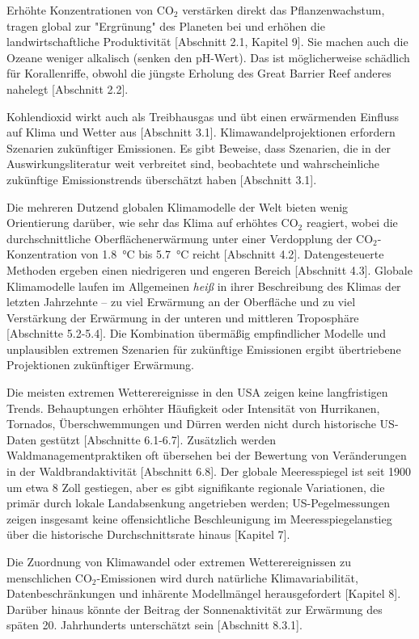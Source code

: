 \documentclass[12pt,paper=a4,DIV=12,parskip=never,chapterprefix=false,headings=standardclasses]{scrreprt}
\begin{document}
Erhöhte Konzentrationen von CO$_2$ verstärken direkt das Pflanzenwachstum, tragen global zur "Ergrünung" des Planeten bei und erhöhen die landwirtschaftliche Produktivität [Abschnitt 2.1, Kapitel 9]. Sie machen auch die Ozeane weniger alkalisch (senken den pH-Wert). Das ist möglicherweise schädlich für Korallenriffe, obwohl die jüngste Erholung des Great Barrier Reef anderes nahelegt [Abschnitt 2.2].

Kohlendioxid wirkt auch als Treibhausgas und übt einen erwärmenden Einfluss auf Klima und Wetter aus [Abschnitt 3.1]. Klimawandelprojektionen erfordern Szenarien zukünftiger Emissionen. Es gibt Beweise, dass Szenarien, die in der Auswirkungsliteratur weit verbreitet sind, beobachtete und wahrscheinliche zukünftige Emissionstrends überschätzt haben [Abschnitt 3.1].

Die mehreren Dutzend globalen Klimamodelle der Welt bieten wenig Orientierung darüber, wie sehr das Klima auf erhöhtes CO$_2$ reagiert, wobei die durchschnittliche Oberflächenerwärmung unter einer Verdopplung der CO$_2$-Konzentration von \SI{1.8}{\celsius} bis \SI{5.7}{\celsius} reicht [Abschnitt 4.2]. Datengesteuerte Methoden ergeben einen niedrigeren und engeren Bereich [Abschnitt 4.3]. Globale Klimamodelle laufen im Allgemeinen \emph{heiß} in ihrer Beschreibung des Klimas der letzten Jahrzehnte -- zu viel Erwärmung an der Oberfläche und zu viel Verstärkung der Erwärmung in der unteren und mittleren Troposphäre [Abschnitte 5.2-5.4]. Die Kombination übermäßig empfindlicher Modelle und unplausiblen extremen Szenarien für zukünftige Emissionen ergibt übertriebene Projektionen zukünftiger Erwärmung.

Die meisten extremen Wetterereignisse in den USA zeigen keine langfristigen Trends. Behauptungen erhöhter Häufigkeit oder Intensität von Hurrikanen, Tornados, Überschwemmungen und Dürren werden nicht durch historische US-Daten gestützt [Abschnitte 6.1-6.7]. Zusätzlich werden Waldmanagementpraktiken oft übersehen bei der Bewertung von Veränderungen in der Waldbrandaktivität [Abschnitt 6.8]. Der globale Meeresspiegel ist seit 1900 um etwa 8 Zoll gestiegen, aber es gibt signifikante regionale Variationen, die primär durch lokale Landabsenkung angetrieben werden; US-Pegelmessungen zeigen insgesamt keine offensichtliche Beschleunigung im Meeresspiegelanstieg über die historische Durchschnittsrate hinaus [Kapitel 7].

Die Zuordnung von Klimawandel oder extremen Wetterereignissen zu menschlichen CO$_2$-Emissionen wird durch natürliche Klimavariabilität, Datenbeschränkungen und inhärente Modellmängel herausgefordert [Kapitel 8]. Darüber hinaus könnte der Beitrag der Sonnenaktivität zur Erwärmung des späten 20. Jahrhunderts unterschätzt sein [Abschnitt 8.3.1].
\end{document}

